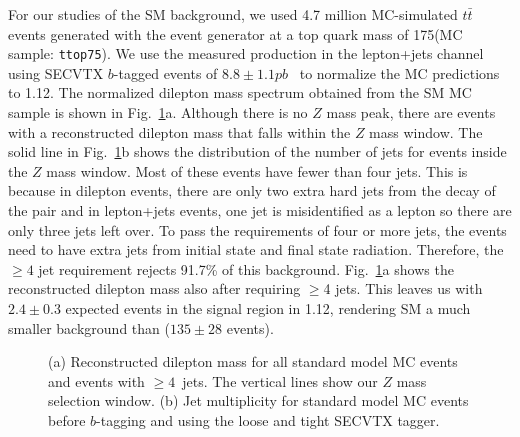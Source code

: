 For our studies of the SM \ttbar background, we used 4.7 million
MC-simulated $t\bar{t}$ events generated with the \pyth event
generator at a top quark mass of 175\gevcsq (MC sample:
\texttt{ttop75}). We use the measured \ttbar production \xsect in the
lepton+jets channel using SECVTX $b$-tagged events of $8.8 \pm
1.1\unit{pb}$~\cite{CDF8767} to normalize the MC predictions to
1.12\invfb. The normalized dilepton mass spectrum obtained from the SM
\ttbar MC sample is shown in Fig.~\ref{fig:dilepmass_SMtop}a.  Although
there is no $Z$ mass peak, there are events with a reconstructed
dilepton mass that falls within the $Z$ mass window. The solid line in
Fig.~\ref{fig:dilepmass_SMtop}b shows the distribution of the number of
jets for events inside the $Z$ mass window.  Most of these events have
fewer than four jets. This is because in dilepton events, there are
only two extra hard jets from the decay of the \ttbar pair and in
lepton+jets events, one jet is misidentified as a lepton so there are
only three jets left over. To pass the requirements of four or more
jets, the events need to have extra jets from initial state and final
state radiation. Therefore, the $\geq 4$ jet requirement rejects
91.7\% of this background. Fig.~\ref{fig:dilepmass_SMtop}a shows the 
reconstructed dilepton mass also after requiring $\geq$4 jets. This leaves 
us with $2.4\pm 0.3$ expected events in the signal region in 1.12\invfb, 
rendering SM \ttbar a much smaller background than \Zj ($135\pm 28$ events).


\begin{figure}[t]
  \begin{center}
  \end{center}
  
  \caption{(a) Reconstructed dilepton mass for all standard model
    \ttbar MC events and events with $\geq 4$~jets. The vertical lines
    show our $Z$ mass selection window. (b) Jet multiplicity for
    standard model \ttbar MC events before $b$-tagging and using the
    loose and tight SECVTX tagger.}
  \label{fig:dilepmass_SMtop}
\end{figure}


